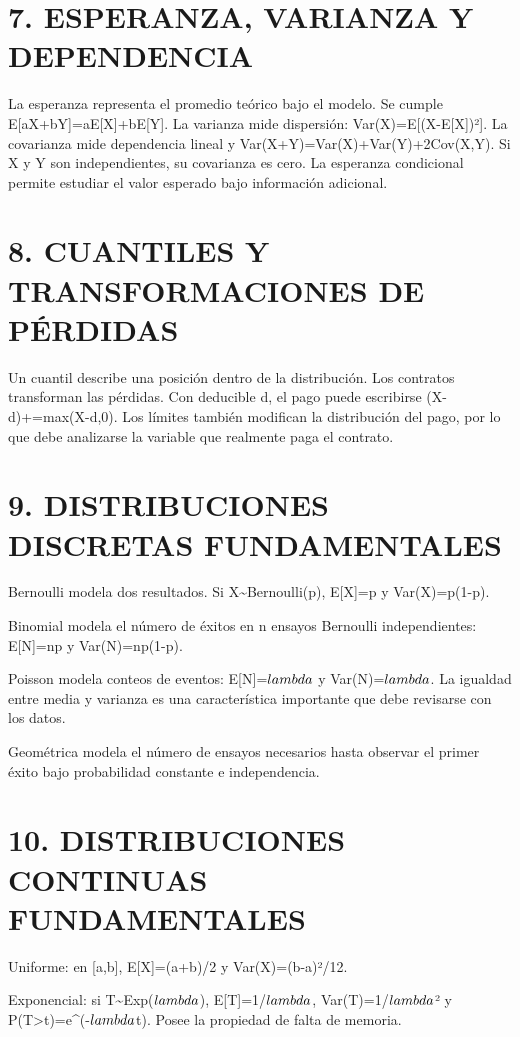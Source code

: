 \documentclass[11pt]{article}
\begin{document}
\section*{7. ESPERANZA, VARIANZA Y DEPENDENCIA}

La esperanza representa el promedio teórico bajo el modelo. Se cumple E[aX+bY]=aE[X]+bE[Y]. La varianza mide dispersión: Var(X)=E[(X-E[X])²]. La covarianza mide dependencia lineal y Var(X+Y)=Var(X)+Var(Y)+2Cov(X,Y). Si X y Y son independientes, su covarianza es cero. La esperanza condicional permite estudiar el valor esperado bajo información adicional.

\section*{8. CUANTILES Y TRANSFORMACIONES DE PÉRDIDAS}

Un cuantil describe una posición dentro de la distribución. Los contratos transforman las pérdidas. Con deducible d, el pago puede escribirse (X-d)+=max(X-d,0). Los límites también modifican la distribución del pago, por lo que debe analizarse la variable que realmente paga el contrato.

\section*{9. DISTRIBUCIONES DISCRETAS FUNDAMENTALES}

Bernoulli modela dos resultados. Si X\textasciitilde{}Bernoulli(p), E[X]=p y Var(X)=p(1-p).

Binomial modela el número de éxitos en n ensayos Bernoulli independientes: E[N]=np y Var(N)=np(1-p).

Poisson modela conteos de eventos: E[N]=$\\lambda$ y Var(N)=$\\lambda$. La igualdad entre media y varianza es una característica importante que debe revisarse con los datos.

Geométrica modela el número de ensayos necesarios hasta observar el primer éxito bajo probabilidad constante e independencia.

\section*{10. DISTRIBUCIONES CONTINUAS FUNDAMENTALES}

Uniforme: en [a,b], E[X]=(a+b)/2 y Var(X)=(b-a)²/12.

Exponencial: si T\textasciitilde{}Exp($\\lambda$), E[T]=1/$\\lambda$, Var(T)=1/$\\lambda$² y P(T>t)=e\textasciicircum{}(-$\\lambda$t). Posee la propiedad de falta de memoria.
\end{document}
